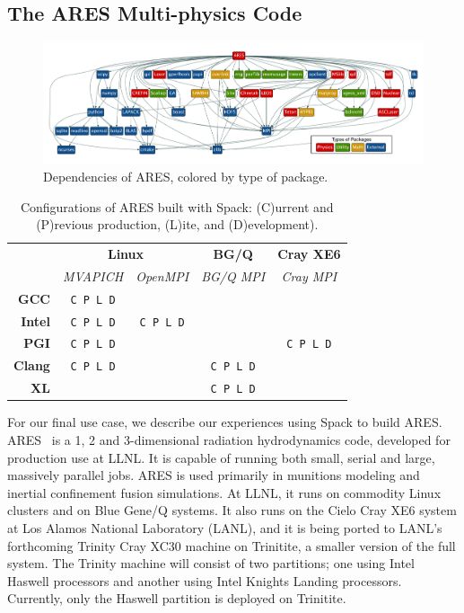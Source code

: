 
\subsection{The ARES Multi-physics Code}
\label{sec:ares}

\begin{figure}
	\includegraphics[width=\textwidth]{figs/ares-dot/ares-fig.pdf}
	\caption{
		Dependencies of ARES, colored by type of package.
		\label{fig:ares}
	}
\end{figure}

\begin{table}\centering
\begin{tabular}{|r|c|c|c|c|}
\hline
\multirow{2}{*}{} & \multicolumn{2}{|c|}{\bf Linux} & {\bf BG/Q}     & {\bf Cray XE6} \\\cline{2-5}
                  & {\it MVAPICH} & {\it OpenMPI}   & {\it BG/Q MPI} & {\it Cray MPI} \\\hline
{\bf GCC}         & {\tt C P L D} &                 &                &                \\\hline
{\bf Intel}       & {\tt C P L D} & {\tt C P L D}   &                &                \\\hline
{\bf PGI}         & {\tt C P L D} &                 &                & {\tt C P L D}  \\\hline
{\bf Clang}       & {\tt C P L D} &                 & {\tt C P L D}  &                \\\hline
{\bf XL}          &               &                 & {\tt C P L D}  &                \\\hline
\end{tabular}
\caption{
	Configurations of ARES built with Spack: \newline
	(C)urrent and
	(P)revious production, (L)ite, and (D)evelopment).
	\label{tab:ares-configs}
}
\end{table}

For our final use case, we describe our experiences using Spack to build ARES.
ARES~\cite{ares1,ares2} is a 1, 2 and 3-dimensional radiation hydrodynamics code,
developed for production use at LLNL.  It is capable of running both small, serial
and large, massively parallel jobs. ARES is used primarily in munitions modeling
and inertial confinement fusion simulations.
%
At LLNL, it runs on commodity Linux clusters and on Blue Gene/Q systems.
It also runs on the Cielo Cray XE6 system at Los Alamos National Laboratory (LANL), and
it is being ported to LANL's forthcoming Trinity Cray XC30 machine on Trinitite,
a smaller version of the full system.  The Trinity machine will consist of two partitions;
one using Intel Haswell processors and another using Intel Knights Landing processors.
Currently, only the Haswell partition is deployed on Trinitite.

